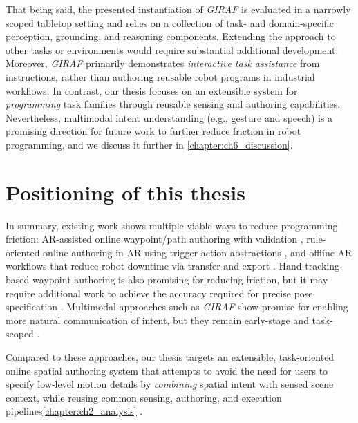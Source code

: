 That being said, the presented instantiation of \emph{GIRAF} is evaluated in a narrowly scoped tabletop setting and relies on a collection of task- and domain-specific perception, grounding, and reasoning components. Extending the approach to other tasks or environments would require substantial additional development. Moreover, \emph{GIRAF} primarily demonstrates \emph{interactive task assistance} from instructions, rather than authoring reusable robot programs in industrial workflows. In contrast, our thesis focuses on an extensible system for \emph{programming} task families through reusable sensing and authoring capabilities. Nevertheless, multimodal intent understanding (e.g., gesture and speech) is a promising direction for future work to further reduce friction in robot programming, and we discuss it further in \autoref{chapter:ch6_discussion}.

\section{Positioning of this thesis}

In summary, existing work shows multiple viable ways to reduce programming friction: AR-assisted online waypoint/path authoring with validation \cite{Ong2020}, rule-oriented online authoring in AR using trigger-action abstractions \cite{Ikeda2024}, and offline AR workflows that reduce robot downtime via transfer and export \cite{Muller2024}. Hand-tracking-based waypoint authoring is also promising for reducing friction, but it may require additional work to achieve the accuracy required for precise pose specification \cite{Vysocky2023}. Multimodal approaches such as \emph{GIRAF} show promise for enabling more natural communication of intent, but they remain early-stage and task-scoped \cite{Lin2023}.

Compared to these approaches, our thesis targets an extensible, task-oriented online spatial authoring system that attempts to avoid the need for users to specify low-level motion details by \emph{combining} spatial intent with sensed scene context, while reusing common sensing, authoring, and execution pipelines\DIFaddbegin {}\autoref{chapter:ch2_analysis} \DIFaddend .
